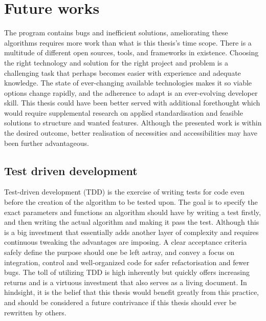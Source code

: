 \section{Future works}
The program contains bugs and inefficient solutions, ameliorating these algorithms requires more work than what is this thesis's time scope. There is a multitude of different open sources, tools, and frameworks in existence. Choosing the right technology and solution for the right project and problem is a challenging task that perhaps becomes easier with experience and adequate knowledge. The state of ever-changing available technologies makes it so viable options change rapidly, and the adherence to adapt is an ever-evolving developer skill. This thesis could have been better served with additional forethought which would require supplemental research on applied standardisation and feasible solutions to structure and wanted features. Although the presented work is within the desired outcome, better realisation of necessities and accessibilities may have been further advantageous.

\subsection{Test driven development}
Test-driven development (TDD) is the exercise of writing tests for code even before the creation of the algorithm to be tested upon. The goal is to specify the exact parameters and functions an algorithm should have by writing a test firstly, and then writing the actual algorithm and making it pass the test. Although this is a big investment that essentially adds another layer of complexity and requires continuous tweaking the advantages are imposing. A clear acceptance criteria safely define the purpose should one be left astray, and convey a focus on integration, control and well-organized code for safer refactorisation and fewer bugs. The toll of utilizing TDD is high inherently but quickly offers increasing returns and is a virtuous investment that also serves as a living document.
In hindsight, it is the belief that this thesis would benefit greatly from this practice, and should be considered a future contrivance if this thesis should ever be rewritten by others.

